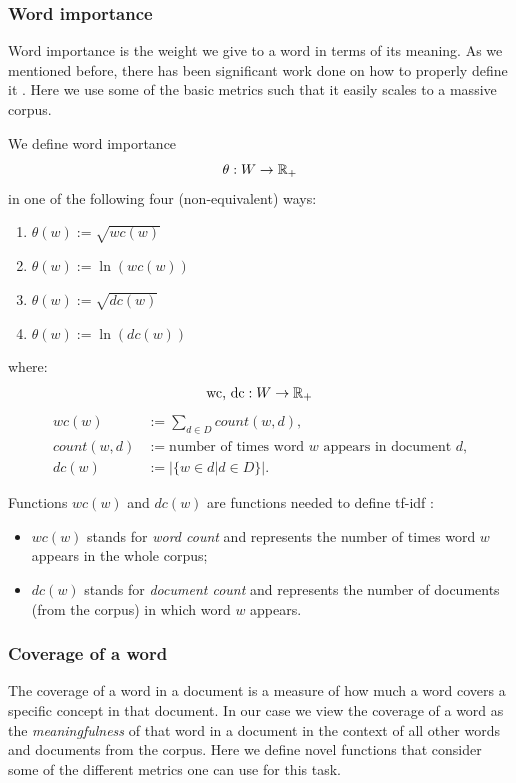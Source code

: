\subsubsection{Word importance}

Word importance is the weight we give to a word in terms of its meaning. As we
mentioned before, there has been significant work done on how to properly
define it \cite{sipos2012temporal} \cite{lin2010multi} \cite{sipos2012large}.
Here we use some of the basic metrics such that it easily scales to a massive
corpus.

\begin{definition}
  \label{def:word-importance}
  We define word importance
  \[\theta : W \to \mathbb{R}_+\]
  in one of the following four (non-equivalent) ways:
  \begin{enumerate}
    \item \(\theta(w) := \sqrt{wc(w)}\)
    \item \(\theta(w) := \ln(wc(w))\)
    \item \(\theta(w) := \sqrt{dc(w)}\)
    \item \(\theta(w) := \ln(dc(w))\)
  \end{enumerate}
  where:
  \[\text{wc, dc} : W \to \mathbb{R}_+\]
  \begin{align*}
    wc(w) &:= \sum_{d \in D} count(w, d), \\
    count(w, d) &:= \text{number of times word \(w\) appears in document
      \(d\),} \\
    dc(w) &:= |\{w \in d | d \in D\}|.
  \end{align*}
\end{definition}
Functions \(wc(w)\) and \(dc(w)\) are functions needed to define tf-idf
\cite{salton1988term}:
\begin{itemize}
  \item \(wc(w)\) stands for \emph{word count} and
    represents the number of times word \(w\) appears in the whole corpus;
  \item \(dc(w)\) stands for \emph{document count} and represents the number of
  documents (from the corpus) in which word \(w\) appears.
\end{itemize}

\subsubsection{Coverage of a word}

The coverage of a word in a document is a measure of how much a word covers a
specific concept in that document. In our case we view the coverage of a word
as the \emph{meaningfulness} of that word in a document in the context of all
other words and documents from the corpus. Here we define novel functions that
consider some of the different metrics one can use for this task.

